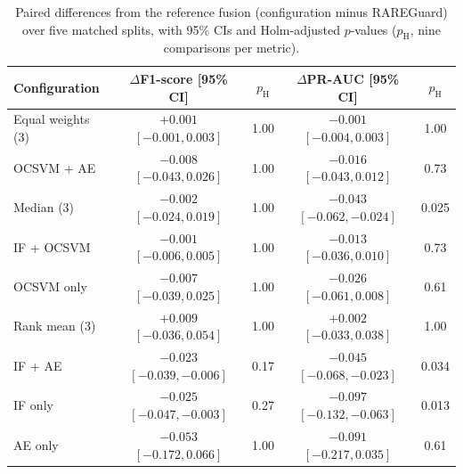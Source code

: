 \begin{table}[t]
\centering
\caption{Paired differences from the reference fusion (configuration minus RAREGuard) over five matched splits, with 95\% CIs and Holm-adjusted $p$-values ($p_{\mathrm{H}}$, nine comparisons per metric).}
\label{tab:fusion}
\small
\begin{tabular}{lcccc}
\toprule
Configuration & $\Delta$F1-score [95\% CI] & $p_{\mathrm{H}}$ & $\Delta$PR-AUC [95\% CI] & $p_{\mathrm{H}}$ \\
\midrule
Equal weights (3) & $+0.001$ $[-0.001, 0.003]$ & 1.00 & $-0.001$ $[-0.004, 0.003]$ & 1.00 \\
OCSVM + AE & $-0.008$ $[-0.043, 0.026]$ & 1.00 & $-0.016$ $[-0.043, 0.012]$ & 0.73 \\
Median (3) & $-0.002$ $[-0.024, 0.019]$ & 1.00 & $-0.043$ $[-0.062, -0.024]$ & 0.025 \\
IF + OCSVM & $-0.001$ $[-0.006, 0.005]$ & 1.00 & $-0.013$ $[-0.036, 0.010]$ & 0.73 \\
OCSVM only & $-0.007$ $[-0.039, 0.025]$ & 1.00 & $-0.026$ $[-0.061, 0.008]$ & 0.61 \\
Rank mean (3) & $+0.009$ $[-0.036, 0.054]$ & 1.00 & $+0.002$ $[-0.033, 0.038]$ & 1.00 \\
IF + AE & $-0.023$ $[-0.039, -0.006]$ & 0.17 & $-0.045$ $[-0.068, -0.023]$ & 0.034 \\
IF only & $-0.025$ $[-0.047, -0.003]$ & 0.27 & $-0.097$ $[-0.132, -0.063]$ & 0.013 \\
AE only & $-0.053$ $[-0.172, 0.066]$ & 1.00 & $-0.091$ $[-0.217, 0.035]$ & 0.61 \\
\bottomrule
\end{tabular}
\end{table}
